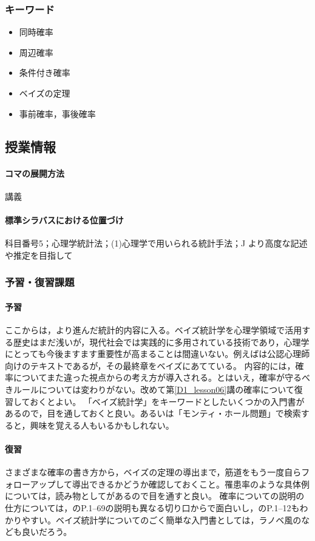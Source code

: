 \subsubsection{キーワード}
\begin{itemize}
\item 同時確率
\item 周辺確率
\item 条件付き確率
\item ベイズの定理
\item 事前確率，事後確率
\end{itemize}
\subsection{授業情報}
\paragraph{コマの展開方法}
講義
\paragraph{標準シラバスにおける位置づけ}
科目番号5；心理学統計法；(1)心理学で用いられる統計手法；J より高度な記述や推定を目指して
\subsubsection{予習・復習課題}
\paragraph{予習}
ここからは，より進んだ統計的内容に入る。ベイズ統計学を心理学領域で活用する歴史はまだ浅いが，現代社会では実践的に多用されている技術であり，心理学にとっても今後ますます重要性が高まることは間違いない。例えば\citet{野島201903}は公認心理師向けのテキストであるが，その最終章をベイズにあてている。
内容的には，確率についてまた違った視点からの考え方が導入される。とはいえ，確率が守るべきルールについては変わりがない。改めて第\ref{D1_lesson06}講の確率について復習しておくとよい。
「ベイズ統計学」をキーワードとしたいくつかの入門書があるので，目を通しておくと良い。あるいは「モンティ・ホール問題」で検索すると，興味を覚える人もいるかもしれない。
\paragraph{復習}
さまざまな確率の書き方から，ベイズの定理の導出まで，筋道をもう一度自らフォローアップして導出できるかどうか確認しておくこと。罹患率のような具体例については，読み物として\citet{Gerd200309}があるので目を通すと良い。
確率についての説明の仕方については，\citet{平岡200910}のP.1--69の説明も異なる切り口からで面白いし，\citet{石田201801}のP.1--12もわかりやすい。ベイズ統計学についてのごく簡単な入門書としては，ラノベ風の\citet{石田石田201902}なども良いだろう。